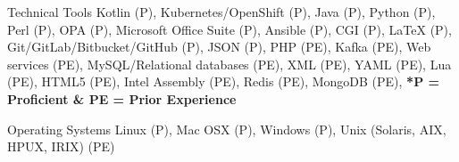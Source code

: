 


\begin{cvskills}


\cvskill
{Technical Tools} %
{Kotlin (P), Kubernetes/OpenShift (P), Java (P), Python (P), Perl (P), OPA (P), Microsoft Office Suite (P), Ansible (P), CGI (P), LaTeX (P), Git/GitLab/Bitbucket/GitHub (P), JSON (P), PHP (PE), Kafka (PE), Web services (PE), MySQL/Relational databases (PE), XML (PE), YAML (PE), Lua (PE),  HTML5 (PE), Intel Assembly (PE),  Redis (PE), MongoDB (PE), \textbf{*P = Proficient \& PE = Prior Experience}} %





\cvskill
{Operating Systems} %
{Linux (P), Mac OSX (P), Windows (P), Unix (Solaris, AIX, HPUX, IRIX) (PE)} %




\end{cvskills}
